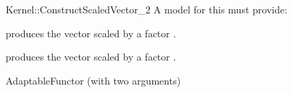\begin{ccRefFunctionObjectConcept}{Kernel::ConstructScaledVector_2}
A model for this must provide:


            {produces the vector  scaled by a factor .}

            {produces the vector  scaled by a factor .}

\ccRefines
AdaptableFunctor (with two arguments)

\ccSeeAlso
{}\\

\end{ccRefFunctionObjectConcept}
